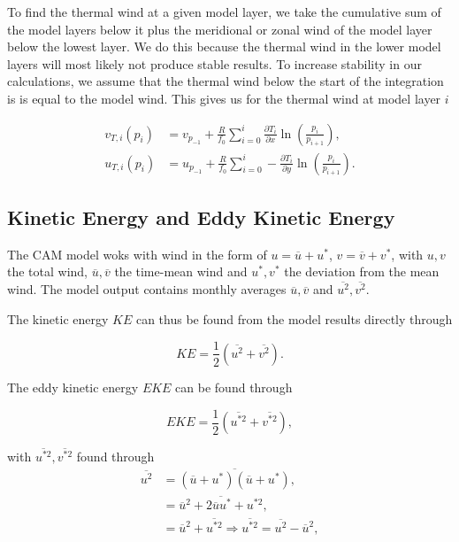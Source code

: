 To find the thermal wind at a given model layer, we take the cumulative sum of the model layers below it plus the meridional or zonal wind of the model layer below the lowest layer. We do this because the thermal wind in the lower model layers will most likely not produce stable results. To increase stability in our calculations, we assume that the thermal wind below the start of the integration is is equal to the model wind. This gives us for the thermal wind at model layer $i$ 

\begin{equation}
    \begin{split}
        v_{T,i}(p_i) &= v_{p_{-1}} + \frac{R}{f_0} \sum_{i=0}^{i} \frac{\partial T_i}{\partial x} \ln \left(\frac{p_i}{p_{i+1}}\right),\\
        u_{T,i}(p_i) &= u_{p_{-1}} + \frac{R}{f_0} \sum_{i=0}^{i} - \frac{\partial T_i}{\partial y} \ln \left(\frac{p_i}{p_{i+1}}\right).
    \end{split}
\end{equation}

\subsection{Kinetic Energy and Eddy Kinetic Energy}
The CAM model woks with wind in the form of $u = \overline{u} + u^{\ast}$, $v = \overline{v} + v^{\ast}$, with $u,v$ the total wind, $\overline{u},\overline{v}$ the time-mean wind and $u^\ast,v^\ast$ the deviation from the mean wind. The model output contains monthly averages $\overline{u},\overline{v}$ and $\overline{u^2},\overline{v^2}$. 

The kinetic energy $KE$ can thus be found from the model results directly through

\begin{equation}
    KE = \frac{1}{2} \left( \overline{u^2} + \overline{v^2} \right).
\end{equation}

The eddy kinetic energy $EKE$ can be found through 

\begin{equation}
    EKE = \frac{1}{2} \left( \overline{u^{\ast 2}} + \overline{v^{\ast 2}} \right),
\end{equation}

\noindent with $\overline{u^{\ast 2}}, \overline{v^{\ast 2}}$ found through
\begin{equation}
    \begin{split}
        \overline{u^2} &= \overline{\left( \overline{u} + u^\ast \right) \left( \overline{u} + u^\ast \right)},\\
        &= \overline{\overline{u}^2 + 2 \overline{u}u^\ast + u^{\ast 2}},\\
        &= \overline{u}^2 + \overline{u^{\ast 2}} \Rightarrow \overline{u^{\ast 2}} = \overline{u^2} - \overline{u}^2, 
    \end{split}
\end{equation}

